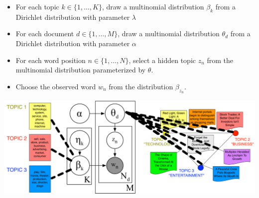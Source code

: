 \documentclass[xcolor=dvipsnames]{beamer}
\newcommand{\g}[1]{\Gamma \left( #1 \right)}
\begin{document}
{\begin{itemize}
\item<1-> For each topic $k \in \{1, \dots, K\}$, draw a multinomial distribution $\beta_k$ from a Dirichlet distribution with parameter $\lambda$
\item<2-> For each document $d \in \{1, \dots, M\}$, draw a multinomial distribution $\theta_d$ from a Dirichlet distribution with parameter $\alpha$
\item<3-> For each word position $n \in \{1, \dots, N\}$, select a hidden topic $z_n$ from the multinomial distribution parameterized by $\theta$.
\item<4-> Choose the observed word $w_n$ from the distribution $\beta_{z_n}$.
\end{itemize}

}

\begin{frame}

	\includegraphics[width=1.0\linewidth]{mrlda/lda_graphmod_nyt}

\end{frame}


\providecommand{\dirfunc}[3]{ \frac{ \prod_{#1}^{#2} \g{ #3 } } { \g{ \sum_{#1}^{#2} #3 }}}
\providecommand{\dirnum}[4]{ \frac{\g{ #3 }}{#4} \prod_{#1}^{#2} }
\providecommand{\dirden}[3]{ \g{ \sum_{#1}^{#2} #3 } }
\end{document}
